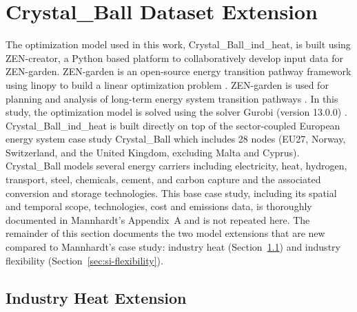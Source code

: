 \section{Crystal\_Ball Dataset Extension}
\label{sec:si-extension}

The optimization model used in this work, Crystal\_Ball\_ind\_heat, is built using ZEN-creator, a Python based platform to collaboratively develop input data for ZEN-garden. ZEN-garden is an open-source energy transition pathway framework using linopy to build a linear optimization problem \cite{Hofmann2023}. ZEN-garden is used for planning and analysis of long-term energy system transition pathways \cite{Mannhardt2025}. In this study, the optimization model is solved using the solver Gurobi (version 13.0.0) \cite{gurobi}. \\

Crystal\_Ball\_ind\_heat is built directly on top of the  sector-coupled European energy system case study Crystal\_Ball which includes 28 nodes (EU27, Norway, Switzerland, and the United Kingdom, excluding Malta and Cyprus). Crystal\_Ball models several energy carriers including electricity, heat, hydrogen, transport, steel, chemicals, cement, and carbon capture and the associated conversion and storage technologies. This base case study, including its spatial and temporal scope, technologies, cost and emissions data, is thoroughly documented in Mannhardt's Appendix~A \cite{Mannhardt2026} and is not repeated here. The remainder of this section documents the two model extensions that are new compared to Mannhardt's case study: industry heat (Section~\ref{sec:si-heat}) and industry flexibility (Section~\ref{sec:si-flexibility}).

\subsection{Industry Heat Extension}
\label{sec:si-heat}

